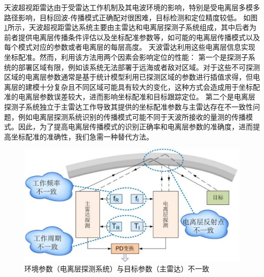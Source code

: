 天波超视距雷达由于受雷达工作机制及其电波环境的影响，特别是受电离层多模多路径影响，目标回波-传播模式正确配对很困难，目标检测和定位精度较低。
如图\ref{fig:pdproblem}所示，天波超视距雷达系统主要由主雷达和电离层探测子系统组成，其中后者为前者提供电离层传播条件评估以及坐标配准参数等，如可能的电离层传播模式以及每个模式对应的参数或者电离层的每层高度\cite{wheadon1994ionospheric}。
天波雷达利用这些电离层信息实现坐标配准。然而，利用该方法用两个因素会影响定位的性能：
第一个是探测子系统的部署区域有限，例如该系统无法部署于远海或者敌对区域。对于这些不可探测区域的电离层参数通常是基于统计模型利用已探测区域的参数进行插值求得，但电离层的建模十分复杂且不同区域可能具有较大的变化，这种方式会造成用于坐标配准的电离层参数误差较大，进而影响坐标配准和目标跟踪定位。
第二个是电离层探测子系统独立于主雷达工作导致其提供的坐标配准参数与主雷达存在不一致性问题，例如电离层探测系统识别的传播模式可能不同于天波所接收的量测的传播模式。因此，为了提高电离层传播模式的识别正确率和电离层参数的准确度，进而提高坐标配准的准确性，我们急需一种替代方法。
\begin{figure}[htb]
	\centering
	\includegraphics[width=\textwidth]{figures/introduction/pdproblem}
	\caption{环境参数（电离层探测系统）与目标参数（主雷达）不一致}
	\label{fig:pdproblem}
\end{figure}


